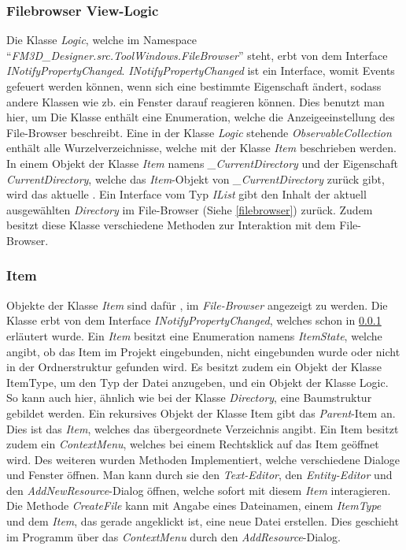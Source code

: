 \subsubsection{Filebrowser View-Logic}
\label{fbview}
Die Klasse \textit{Logic}, welche im Namespace "`\textit{FM3D\_Designer.src.ToolWindows.FileBrowser}"' steht, erbt von dem Interface \textit{INotifyPropertyChanged}. \textit{INotifyPropertyChanged} ist ein Interface, womit Events gefeuert werden können, wenn sich eine bestimmte Eigenschaft ändert, sodass andere Klassen wie zb. ein Fenster darauf reagieren können.
Dies benutzt man hier, um \todo{!!!}
Die Klasse enthält eine Enumeration, welche die Anzeigeeinstellung des File-Browser beschreibt. 
Eine in der Klasse \textit{Logic} stehende \textit{ObservableCollection} enthält alle Wurzelverzeichnisse, welche mit der Klasse \textit{Item} beschrieben werden. In einem Objekt der Klasse \textit{Item} namens \textit{\_CurrentDirectory} und der Eigenschaft \textit{CurrentDirectory}, welche das \textit{Item}-Objekt von \textit{\_CurrentDirectory} zurück gibt, wird das aktuelle . Ein Interface vom Typ \textit{IList} gibt den Inhalt der aktuell ausgewählten \textit{Directory} im File-Browser (Siehe \cref{filebrowser}) zurück. Zudem besitzt diese Klasse verschiedene Methoden zur Interaktion mit dem File-Browser.

\subsubsection{Item}
\label{item}
Objekte der Klasse \textit{Item} sind dafür , im \textit{File-Browser} angezeigt zu werden. Die Klasse erbt von dem Interface \textit{INotifyPropertyChanged}, welches schon in \cref{fbview} erläutert wurde. Ein \textit{Item} besitzt eine Enumeration namens \textit{ItemState}, welche angibt, ob das Item im Projekt eingebunden, nicht eingebunden wurde oder nicht in der Ordnerstruktur gefunden wird. Es besitzt zudem ein Objekt der Klasse ItemType, um den Typ der Datei anzugeben, und ein Objekt der Klasse Logic. So kann auch hier, ähnlich wie bei der Klasse \textit{Directory}, eine Baumstruktur gebildet werden.
Ein rekursives Objekt der Klasse Item gibt das \textit{Parent}-Item an. Dies ist das \textit{Item}, welches das übergeordnete Verzeichnis angibt.
Ein Item besitzt zudem ein \textit{ContextMenu}, welches bei einem Rechtsklick auf das Item geöffnet wird. Des weiteren wurden Methoden Implementiert, welche verschiedene Dialoge und Fenster öffnen. Man kann durch sie den \textit{Text-Editor}, den \textit{Entity-Editor} und den \textit{AddNewResource}-Dialog öffnen, welche sofort mit diesem \textit{Item} interagieren.
Die Methode \textit{CreateFile} kann mit Angabe eines Dateinamen, einem \textit{ItemType} und dem \textit{Item}, das gerade angeklickt ist, eine neue Datei erstellen. Dies geschieht im Programm über das \textit{ContextMenu} durch den \textit{AddResource}-Dialog.

